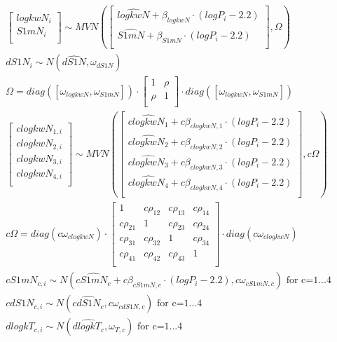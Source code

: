 \documentclass[
]{article}
\begin{document}
\[
\begin{aligned}
& \begin{bmatrix}
logkwN_i \\
S1mN_i\\
\end{bmatrix} \sim
MVN(\begin{bmatrix}
\hat{logkwN}+\beta_{logkwN} \cdot (logP_i-2.2) \\
\hat{S1mN}+\beta_{S1mN} \cdot (logP_i-2.2) \\
\end{bmatrix},  \Omega) \\
& dS1N_i \sim N(\hat{dS1N}, \omega_{dS1N})\\
& \Omega =
diag([\omega_{logkwN},\omega_{S1mN}]) \cdot \begin{bmatrix}
 1 & \rho \\
 \rho & 1  \\
 \end{bmatrix} \cdot diag([\omega_{logkwN},\omega_{S1mN}]) \\
& \begin{bmatrix}
clogkwN_{1,i} \\
clogkwN_{2,i} \\
clogkwN_{3,i} \\
clogkwN_{4,i} \\
\end{bmatrix} \sim
MVN(\begin{bmatrix}
\hat{clogkwN_1}+c\beta_{clogkwN,1} \cdot (logP_i-2.2) \\
\hat{clogkwN_2}+c\beta_{clogkwN,2} \cdot (logP_i-2.2) \\
\hat{clogkwN_3}+c\beta_{clogkwN,3} \cdot (logP_i-2.2) \\
\hat{clogkwN_4}+c\beta_{clogkwN,4} \cdot (logP_i-2.2) \\
\end{bmatrix},  c\Omega) \\
& c\Omega =
diag(c\omega_{clogkwN}) \cdot \begin{bmatrix}
 1 & c\rho_{12} & c\rho_{13} & c\rho_{14} \\
  c\rho_{21} & 1 & c\rho_{23} & c\rho_{24} \\
   c\rho_{31} & c\rho_{32} & 1 & c\rho_{34} \\
   c \rho_{41} & c\rho_{42} & c\rho_{43} & 1 \\
 \end{bmatrix} \cdot diag(c\omega_{clogkwN}) \\
& cS1mN_{c,i} \sim N(\hat{cS1mN_c}+c\beta_{cS1mN, c}\cdot (logP_i-2.2), c\omega_{cS1mN,c}) \text{ for c=1...4} \\
& cdS1N_{c,i} \sim N(\hat{cdS1N_c}, c\omega_{cdS1N,c}) \text{ for c=1...4} \\
& dlogkT_{c,i} \sim N(\hat{dlogkT_c},\omega_{T,c}) \text{ for c=1...4} \\
\end{aligned}
\]
\end{document}
